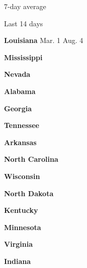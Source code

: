 7-day average

Last 14 days

\textbf{Louisiana} Mar. 1 Aug. 4

\href{https://www.nytimes.com/interactive/2020/us/mississippi-coronavirus-cases.html}{}

\textbf{Mississippi}

\href{https://www.nytimes.com/interactive/2020/us/nevada-coronavirus-cases.html}{}

\textbf{Nevada}

\href{https://www.nytimes.com/interactive/2020/us/alabama-coronavirus-cases.html}{}

\textbf{Alabama}

\href{https://www.nytimes.com/interactive/2020/us/georgia-coronavirus-cases.html}{}

\textbf{Georgia}

\href{https://www.nytimes.com/interactive/2020/us/tennessee-coronavirus-cases.html}{}

\textbf{Tennessee}

\href{https://www.nytimes.com/interactive/2020/us/arkansas-coronavirus-cases.html}{}

\textbf{Arkansas}

\href{https://www.nytimes.com/interactive/2020/us/north-carolina-coronavirus-cases.html}{}

\textbf{North Carolina}

\href{https://www.nytimes.com/interactive/2020/us/wisconsin-coronavirus-cases.html}{}

\textbf{Wisconsin}

\href{https://www.nytimes.com/interactive/2020/us/north-dakota-coronavirus-cases.html}{}

\textbf{North Dakota}

\href{https://www.nytimes.com/interactive/2020/us/kentucky-coronavirus-cases.html}{}

\textbf{Kentucky}

\href{https://www.nytimes.com/interactive/2020/us/minnesota-coronavirus-cases.html}{}

\textbf{Minnesota}

\href{https://www.nytimes.com/interactive/2020/us/virginia-coronavirus-cases.html}{}

\textbf{Virginia}

\href{https://www.nytimes.com/interactive/2020/us/indiana-coronavirus-cases.html}{}

\textbf{Indiana}

